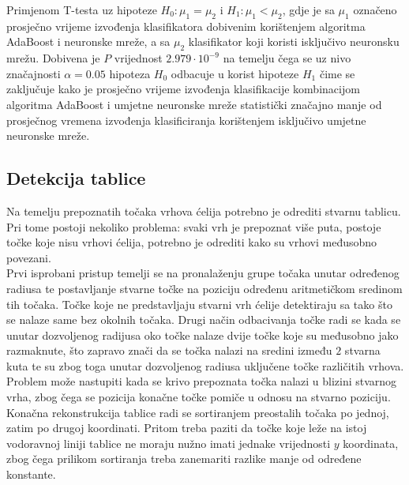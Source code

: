 \documentclass[times, utf8, zavrsni, numeric]{fer}
\begin{document}
Primjenom T-testa uz hipoteze $H_0: \mu_1 = \mu_2$ i $H_1: \mu_1 < \mu_2$, gdje je sa $\mu_1$ označeno prosječno vrijeme izvođenja klasifikatora dobivenim korištenjem algoritma AdaBoost i neuronske mreže, a sa $\mu_2$ klasifikator koji koristi isključivo neuronsku mrežu.
Dobivena je $P$ vrijednost $2.979\cdot10^{-9}$ na temelju čega se uz nivo značajnosti $\alpha = 0.05$   hipoteza $H_0$ odbacuje u korist hipoteze $H_1$ čime se zaključuje kako je prosječno vrijeme izvođenja klasifikacije kombinacijom algoritma AdaBoost i umjetne neuronske mreže statistički značajno manje od prosječnog vremena izvođenja klasificiranja korištenjem isključivo umjetne neuronske mreže.

\subsection{Detekcija tablice}
Na temelju prepoznatih točaka vrhova ćelija potrebno je odrediti stvarnu tablicu.
Pri tome postoji nekoliko problema: svaki vrh je prepoznat više puta, postoje točke koje nisu vrhovi ćelija, potrebno je odrediti kako su vrhovi međusobno povezani.\\

Prvi isprobani pristup temelji se na pronalaženju grupe točaka unutar određenog radiusa te postavljanje stvarne točke na poziciju određenu aritmetičkom sredinom tih točaka.
Točke koje ne predstavljaju stvarni vrh ćelije detektiraju sa tako što se nalaze same bez okolnih točaka.
Drugi način odbacivanja točke radi se kada se unutar dozvoljenog radijusa oko točke nalaze dvije točke koje su međusobno jako razmaknute, što zapravo znači da se točka nalazi na sredini između $2$ stvarna kuta te su zbog toga unutar dozvoljenog radiusa uključene točke različitih vrhova.
Problem može nastupiti kada se krivo prepoznata točka nalazi u blizini stvarnog vrha, zbog čega se pozicija konačne točke pomiče u odnosu na stvarno poziciju.\\

Konačna rekonstrukcija tablice radi se sortiranjem preostalih točaka po jednoj, zatim po drugoj koordinati.
Pritom treba paziti da točke koje leže na istoj vodoravnoj liniji tablice ne moraju nužno imati jednake vrijednosti $y$ koordinata, zbog čega prilikom sortiranja treba zanemariti razlike manje od određene konstante.
\end{document}
